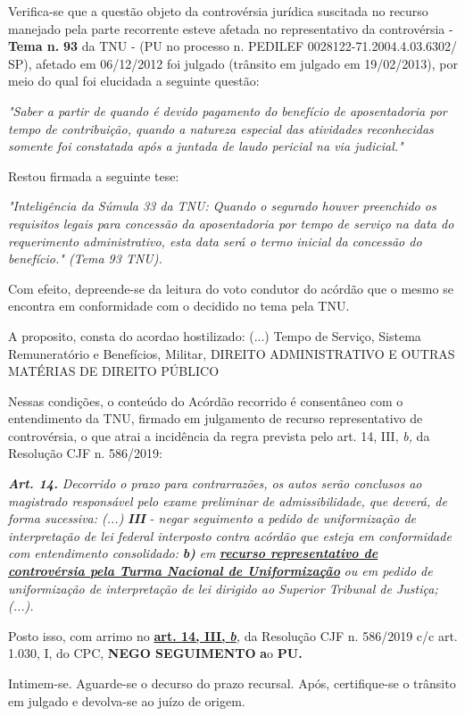 \documentclass[12pt]{article}
\begin{document}
\justifying
\noindent Verifica-se que a questão objeto da controvérsia jurídica suscitada no recurso manejado pela parte recorrente esteve afetada no representativo da controvérsia - \textbf{Tema n. }\textbf{93} da TNU - (PU no processo n. PEDILEF 0028122-71.2004.4.03.6302/ SP),  afetado em 06/12/2012 foi julgado (trânsito em julgado em 19/02/2013), por meio do qual foi elucidada a seguinte questão:

\noindent \textit{"Saber a partir de quando é devido pagamento do benefício de aposentadoria por tempo de contribuição, quando a natureza especial das atividades reconhecidas somente foi constatada após a juntada de laudo pericial na via judicial."}

\noindent Restou firmada a seguinte tese:

\noindent \textit{"Inteligência da Súmula 33 da TNU: Quando o segurado houver preenchido os requisitos legais para concessão da aposentadoria por tempo de serviço na data do requerimento administrativo, esta data será o termo inicial da concessão do benefício." (Tema 93 TNU).}

\noindent Com efeito, depreende-se da leitura do voto condutor do acórdão que o mesmo se encontra em conformidade com o decidido no  tema pela TNU.

\noindent A proposito, consta do acordao hostilizado: (...) Tempo de Serviço, Sistema Remuneratório e Benefícios, Militar, DIREITO ADMINISTRATIVO E OUTRAS MATÉRIAS DE DIREITO PÚBLICO

\noindent Nessas condições, o conteúdo do Acórdão recorrido é consentâneo com o entendimento da TNU, firmado em julgamento de recurso representativo de controvérsia, o que atrai a incidência da regra prevista pelo art. 14, III, \textit{b,} da Resolução CJF n. 586/2019:

\noindent \textit{\textbf{Art. 14.}}\textit{ Decorrido o prazo para contrarrazões, os autos serão conclusos ao magistrado responsável pelo exame preliminar de admissibilidade, que deverá, de forma sucessiva: (...) }\textit{\textbf{III }}\textit{- negar seguimento a pedido de uniformização de interpretação de lei federal interposto contra acórdão que esteja em conformidade com entendimento consolidado: }\textit{\textbf{b)}}\textit{ em }\uline{\textit{\textbf{recurso representativo de controvérsia pela Turma Nacional de Uniformização}}}\textit{ ou em pedido de uniformização de interpretação de lei dirigido ao Superior Tribunal de Justiça;(...).}

\noindent Posto isso, com arrimo no \uline{\textbf{art. 14, III, }}\uline{\textit{\textbf{b}}}\textit{,} da Resolução CJF n. 586/2019 c/c art. 1.030, I, do CPC, \textbf{NEGO SEGUIMENTO }\textbf{a}o\textbf{ PU}\textbf{.}

\noindent Intimem-se. Aguarde-se o decurso do prazo recursal. Após, certifique-se o trânsito em julgado e devolva-se ao juízo de origem.
\end{document}
